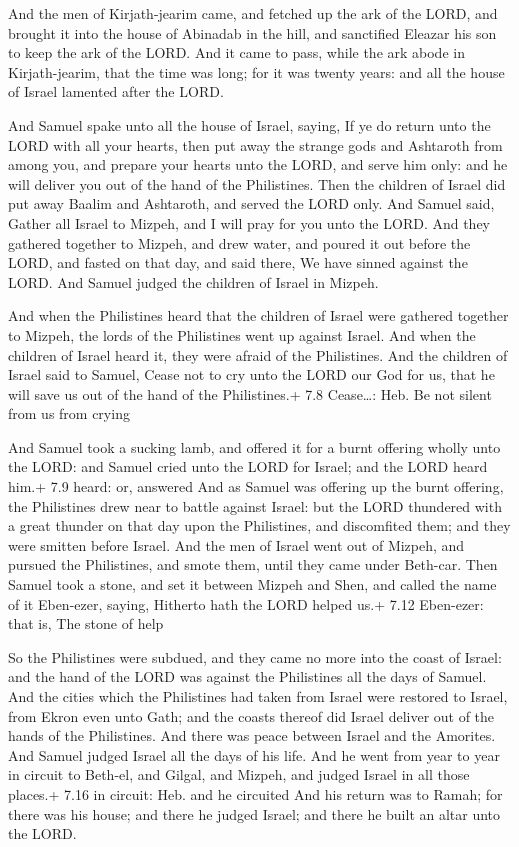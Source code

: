  And the men of Kirjath-jearim came, and fetched up the ark
of the LORD, and brought it into the house of Abinadab in the hill, and
sanctified Eleazar his son to keep the ark of the LORD.  And
it came to pass, while the ark abode in Kirjath-jearim, that the time
was long; for it was twenty years: and all the house of Israel lamented
after the LORD.

 And Samuel spake unto all the house of Israel, saying, If
ye do return unto the LORD with all your hearts, then put away the
strange gods and Ashtaroth from among you, and prepare your hearts unto
the LORD, and serve him only: and he will deliver you out of the hand of
the Philistines.  Then the children of Israel did put away
Baalim and Ashtaroth, and served the LORD only.  And Samuel
said, Gather all Israel to Mizpeh, and I will pray for you unto the
LORD.  And they gathered together to Mizpeh, and drew water,
and poured it out before the LORD, and fasted on that day, and said
there, We have sinned against the LORD. And Samuel judged the children
of Israel in Mizpeh.

 And when the Philistines heard that the children of Israel
were gathered together to Mizpeh, the lords of the Philistines went up
against Israel. And when the children of Israel heard it, they were
afraid of the Philistines.  And the children of Israel said
to Samuel, Cease not to cry unto the LORD our God for us, that he will
save us out of the hand of the Philistines.+ 7.8 Cease\ldots: Heb. Be
not silent from us from crying

 And Samuel took a sucking lamb, and offered it for a
burnt offering wholly unto the LORD: and Samuel cried unto the LORD for
Israel; and the LORD heard him.+ 7.9 heard: or, answered 
And as Samuel was offering up the burnt offering, the Philistines drew
near to battle against Israel: but the LORD thundered with a great
thunder on that day upon the Philistines, and discomfited them; and they
were smitten before Israel.  And the men of Israel went out
of Mizpeh, and pursued the Philistines, and smote them, until they came
under Beth-car.  Then Samuel took a stone, and set it
between Mizpeh and Shen, and called the name of it Eben-ezer, saying,
Hitherto hath the LORD helped us.+ 7.12 Eben-ezer: that is, The stone of
help

 So the Philistines were subdued, and they came no more
into the coast of Israel: and the hand of the LORD was against the
Philistines all the days of Samuel.  And the cities which
the Philistines had taken from Israel were restored to Israel, from
Ekron even unto Gath; and the coasts thereof did Israel deliver out of
the hands of the Philistines. And there was peace between Israel and the
Amorites.  And Samuel judged Israel all the days of his
life.  And he went from year to year in circuit to Beth-el,
and Gilgal, and Mizpeh, and judged Israel in all those places.+ 7.16 in
circuit: Heb. and he circuited  And his return was to
Ramah; for there was his house; and there he judged Israel; and there he
built an altar unto the LORD.

